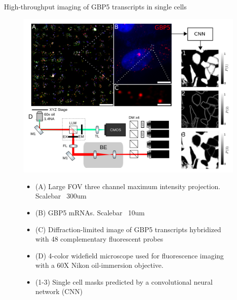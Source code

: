 \documentclass{beamer}					%
\begin{document}
\begin{frame}{High-throughput imaging of GBP5 transcripts in single cells}
\begin{figure}
\includegraphics[width=11.5cm]{Figure-1.png}
\begin{itemize}
\item {\fontsize{8pt}{16.8pt}\selectfont (A) Large FOV three channel maximum intensity projection. Scalebar ~300um }
\item {\fontsize{8pt}{16.8pt}\selectfont (B)  GBP5 mRNAs. Scalebar ~10um }
\item {\fontsize{8pt}{16.8pt}\selectfont (C) Diffraction-limited image of GBP5 transcripts hybridized with 48 complementary fluorescent probes }
\item {\fontsize{8pt}{16.8pt}\selectfont (D) 4-color widefield microscope used for fluorescence imaging with a 60X Nikon oil-immersion objective.}
\item {\fontsize{8pt}{16.8pt}\selectfont (1-3) Single cell masks predicted by a convolutional neural network (CNN)}
\end{itemize}
\end{figure}
\end{frame}
\end{document}
